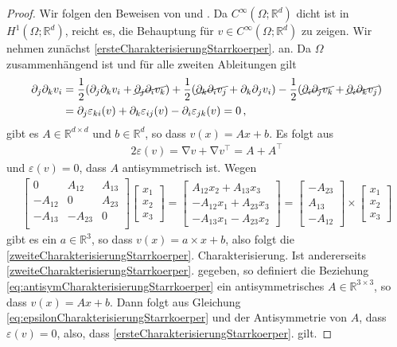 \documentclass{scrartcl}
\def\R{\mathbb{R}}
\def\e{\varepsilon}
\DeclareMathOperator{\grad}{\nabla}         %
\newcommand{\vect}[1]{\begin{bmatrix} #1 \end{bmatrix}}
\begin{document}
\begin{proof}
	Wir folgen den Beweisen von \cite[S.293]{Cia-1988} und \cite[S.295]{Bra-2007}. Da $C^\infty(\Omega;\R^d)$ dicht ist in $H^1(\Omega;\R^d)$, reicht es, die Behauptung für $v\in C^\infty(\Omega;\R^d)$ zu zeigen. Wir nehmen zunächst \ref{ersteCharakterisierungStarrkoerper}. an. Da $\Omega$ zusammenhängend ist und für alle zweiten Ableitungen gilt
	\begin{align*}
		\partial_j\partial_k v_i
		&= \frac{1}{2}(\partial_j\partial_k v_i+\cancel{\partial_j\partial_iv_k})+\frac{1}{2}(\cancel{\partial_k\partial_iv_j}+\partial_k\partial_jv_i)-\frac{1}{2}(\cancel{\partial_i\partial_jv_k}+\cancel{\partial_i\partial_kv_j}) \\
		&= \partial_j\e_{ki}(v)+\partial_k\e_{ij}(v)-\partial_i\e_{jk}(v) = 0\,,
	\end{align*}
	gibt es $A\in\R^{d\times d}$ und $b\in\R^d$, so dass $v(x)=Ax+b$. Es folgt aus
	\begin{align}
		2\e(v) =\grad v + \grad v^\top=A+A^\top \label{eq:epsilonCharakterisierungStarrkoerper}
	\end{align}
	und $\e(v)=0$, dass $A$ antisymmetrisch ist. Wegen
	\begin{align}
		\begin{bmatrix}
			0 & A_{12} & A_{13} \\
			-A_{12} & 0 & A_{23} \\
			-A_{13} & -A_{23} & 0 \\
		\end{bmatrix}
		\vect{x_1 \\x_2\\x_3}
		= \vect{A_{12}x_2+A_{13}x_3 \\ -A_{12}x_1+A_{23}x_3 \\ -A_{13}x_1-A_{23}x_2}
		= \vect{-A_{23}\\ A_{13}\\ -A_{12}}\times\vect{x_1 \\x_2\\x_3}
		\label{eq:antisymCharakterisierungStarrkoerper}
	\end{align}
	gibt es ein $a\in\R^3$, so dass $v(x)=a\times x+b$, also folgt die \ref{zweiteCharakterisierungStarrkoerper}. Charakterisierung. Ist andererseits \ref{zweiteCharakterisierungStarrkoerper}. gegeben, so definiert die Beziehung \eqref{eq:antisymCharakterisierungStarrkoerper} ein antisymmetrisches $A\in\R^{3\times 3}$, so dass $v(x) = Ax+b$. Dann folgt aus Gleichung \eqref{eq:epsilonCharakterisierungStarrkoerper} und der Antisymmetrie von $A$, dass $\e(v) = 0$, also, dass \ref{ersteCharakterisierungStarrkoerper}. gilt.
\end{proof}
\end{document}
